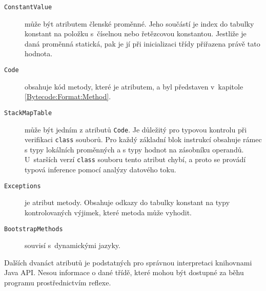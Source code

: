 \begin{description}

\item [\texttt{ConstantValue}] může být atributem členské proměnné. Jeho součástí je index do tabulky konstant na položku s~číselnou nebo řetězcovou konstantou. Jestliže je daná proměnná statická, pak je jí při inicializaci třídy přiřazena právě tato hodnota.

\item [\texttt{Code}] obsahuje kód metody, které je atributem, a byl představen v~kapitole \ref{Bytecode:Format:Method}.

\item [\texttt{StackMapTable}] může být jedním z atributů \texttt{Code}. Je důležitý pro typovou kontrolu při verifikaci \texttt{class} souborů. Pro každý základní blok instrukcí obsahuje rámec s typy lokálních proměnných a s typy hodnot na zásobníku operandů. U~starších verzí \texttt{class} souboru tento atribut chybí, a proto se provádí typová inference pomocí analýzy datového toku.

\item [\texttt{Exceptions}] je atribut metody. Obsahuje odkazy do tabulky konstant na typy kontrolovaných výjimek, které metoda může vyhodit.

\item [\texttt{BootstrapMethods}] souvisí s~dynamickými jazyky.

\end{description}

Dalších dvanáct atributů je podstatných pro správnou interpretaci knihovnami Java API. Nesou informace o dané třídě, které mohou být dostupné za běhu programu prostřednictvím reflexe.

